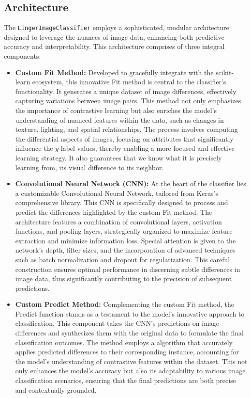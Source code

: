 \documentclass[a4paper, 12pt]{report}
\begin{document}
\subsection{Architecture}
The \texttt{LingerImageClassifier} employs a sophisticated, modular architecture designed to leverage the nuances of image data, 
enhancing both predictive accuracy and interpretability. 
This architecture comprises of three integral components:

\begin{itemize}
    \item \textbf{Custom Fit Method:} Developed to gracefully integrate with the scikit-learn \cite{scikit} ecosystem, this innovative Fit method is central to the classifier's functionality. 
    It generates a unique dataset of image differences, effectively capturing variations between image pairs. This method not only emphasizes the importance of contrastive learning but also enriches the model's understanding of nuanced features within the data, 
    such as changes in texture, lighting, and spatial relationships. The process involves computing the differential aspects of images, focusing on attributes that significantly influence the $y$ label values, thereby enabling a more focused and effective learning strategy.
    It also guarantees that we know what it is precisely learning from, its visual difference to its neighbor.

    \item \textbf{Convolutional Neural Network (CNN):} At the heart of the classifier lies a customizable Convolutional Neural Network, tailored from Keras's comprehensive library. 
    This CNN is specifically designed to process and predict the differences highlighted by the custom Fit method. The architecture features a combination of convolutional layers, activation functions, 
    and pooling layers, strategically organized to maximize feature extraction and minimize information loss. Special attention is given to the network's depth, filter sizes, 
    and the incorporation of advanced techniques such as batch normalization and dropout for regularization. 
    This careful construction ensures optimal performance in discerning subtle differences in image data, thus significantly contributing to the precision of subsequent predictions.
    
    \item \textbf{Custom Predict Method:} Complementing the custom Fit method, 
    the Predict function stands as a testament to the model's innovative approach to classification. 
    This component takes the CNN's predictions on image differences and synthesizes them with the original data to formulate the final classification outcomes. 
    The method employs a algorithm that accurately applies predicted differences to their corresponding instance, accounting for the model's understanding of contrastive features within the dataset. 
    This not only enhances the model's accuracy but also its adaptability to various image classification scenarios, ensuring that the final predictions are both precise and contextually grounded.
\end{itemize}
\end{document}
